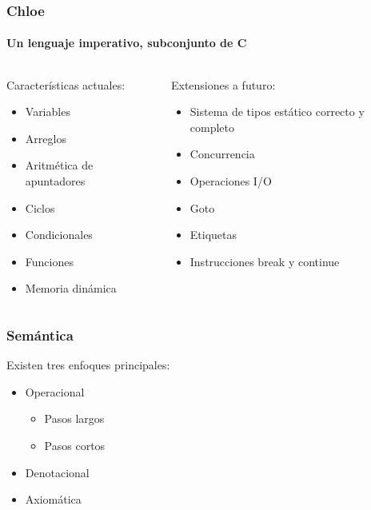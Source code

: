 \begin{frame}
\frametitle{Chloe}
\framesubtitle{Un lenguaje imperativo, subconjunto de C}

\begin{columns}[t]
\begin{block}{Características actuales:}
\pause
\begin{itemize}
\item{Variables}
\pause
\item{Arreglos}
\pause
\item{Aritmética de apuntadores}
\pause
\item{Ciclos}
\pause
\item{Condicionales}
\pause
\item{Funciones}
\pause
\item{Memoria dinámica}
\pause
\end{itemize}
\end{block}
\begin{block}{Extensiones a futuro:}
\begin{itemize}
\pause
\item{Sistema de tipos estático correcto y completo}
\pause
\item{Concurrencia}
\pause
\item{Operaciones I/O}
\pause
\item{Goto}
\pause
\item{Etiquetas}
\pause
\item{Instrucciones break y continue}
\end{itemize}
\pause
\end{block}
\end{columns}

\end{frame}


\begin{frame}
\frametitle{Semántica}

\pause

Existen tres enfoques principales:

\pause

\begin{itemize}
\item{Operacional}
\pause
  \begin{itemize}
    \item{Pasos largos}
    \item{Pasos cortos}
  \end{itemize}
\pause
\item{Denotacional}
\pause
\item{Axiomática}
\pause
\end{itemize}

\end{frame}

